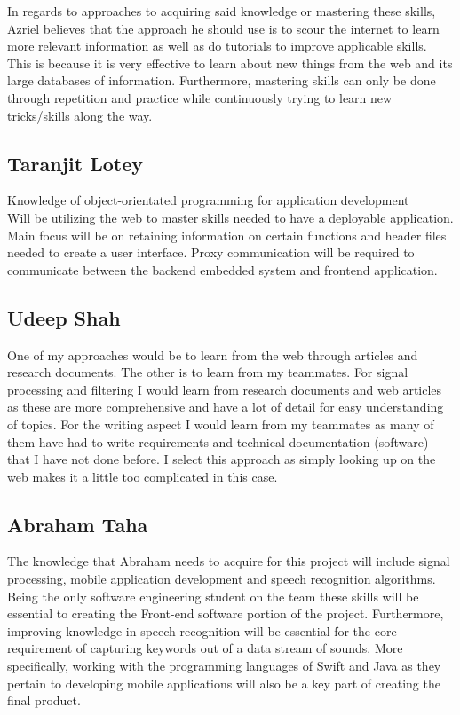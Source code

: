 \documentclass[12pt]{article}
\begin{document}
\noindent
In regards to approaches to acquiring said knowledge or mastering these skills, Azriel believes
that the approach he should use is to scour the internet to learn more relevant information as 
well as do tutorials to improve applicable skills. This is because it is very effective to learn 
about new things from the web and its large databases of information. Furthermore, mastering skills 
can only be done through repetition and practice while continuously trying to learn new tricks/skills 
along the way.

\subsection*{Taranjit Lotey}
Knowledge of object-orientated programming for application development \\
Will be utilizing the web to master skills needed to have a deployable application.
Main focus will be on retaining information on certain functions and header files 
needed to create a user interface. Proxy communication will be required to communicate 
between the backend embedded system and frontend application.\\

\subsection*{Udeep Shah}
One of my approaches would be to learn from the web through articles and research documents. The other is to learn from my teammates.
For signal processing and filtering I would learn from research documents and web articles as these are more comprehensive and have a lot of detail for easy understanding of topics. For the writing aspect I would learn from my teammates as many of them have had to write requirements and technical documentation (software) that I have not done before. I select this approach as simply looking up on the web makes it a little too complicated in this case.


\subsection*{Abraham Taha}
The knowledge that Abraham needs to acquire for this project will include signal processing, mobile application development and speech recognition algorithms. Being the only software engineering student on the team these skills will be essential to creating the Front-end software portion of the project. Furthermore, improving knowledge in speech recognition will be essential for the core requirement of capturing keywords out of a data stream of sounds. More specifically, working with the programming languages of Swift and Java as they pertain to developing mobile applications will also be a key part of creating the final product. 
\newline
\end{document}
